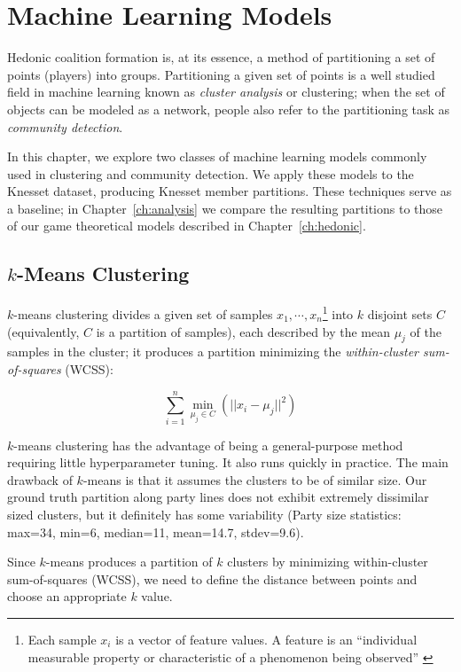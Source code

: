 
\chapter{Machine Learning Models}
\label{ch:comparison}
Hedonic coalition formation is, at its essence, a method of partitioning a set 
of points (players) into groups. 
Partitioning a given set of points is a well studied field in machine learning
known as {\em cluster analysis} or clustering;
when the set of objects can be modeled as a network, people also refer to the
partitioning task as {\em community detection}.

In this chapter, we explore two classes of machine learning models commonly used
in clustering and community detection.
We apply these models to the Knesset dataset, producing Knesset member partitions. These techniques serve as a baseline;
in Chapter~\ref{ch:analysis} we compare the resulting partitions to those of our game theoretical models described in Chapter~\ref{ch:hedonic}.


\section{$k$-Means Clustering}
\label{sec:k_means_clustering}

$k$-means clustering\cite{Tan:2018:IDM:3208440} divides a given set of samples
$x_1, \cdots, x_n$\footnote{Each sample $x_i$ is a vector of feature values. 
A feature is an ``individual measurable property or characteristic of a
phenomenon being observed'' \cite{Bishop:2006:PRM:1162264}} into $k$ disjoint
sets $C$ (equivalently, $C$ is a partition of samples), each described by the
mean $\mu_j$ of the samples in the cluster;
it produces a partition minimizing the {\em within-cluster sum-of-squares} (WCSS):

\[
    \sum_{i=1}^{n} \underset{\mu_j \in C}{\min}(||x_i - \mu_j||^2)
\]

$k$-means clustering has the advantage of being a general-purpose method
requiring little hyperparameter tuning. 
It also runs quickly in practice.
The main drawback of $k$-means is that it assumes the clusters to be of similar
size.
Our ground truth partition along party lines does not exhibit extremely
dissimilar sized clusters, but it definitely has some variability (Party size
statistics: max=34, min=6, median=11, mean=14.7, stdev=9.6).

Since $k$-means produces a partition of $k$ clusters by minimizing within-cluster
sum-of-squares (WCSS), we need to define the distance between points and choose
an appropriate $k$ value.

